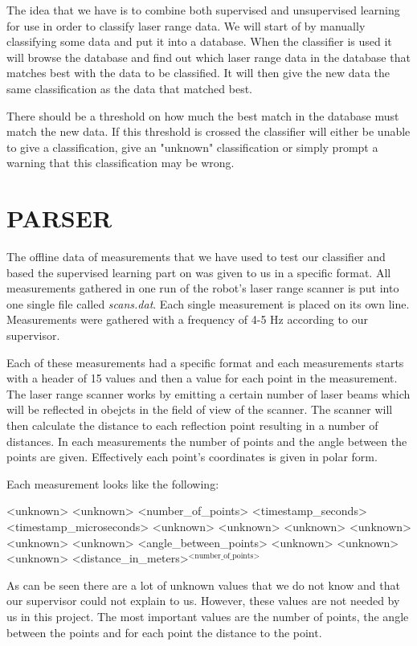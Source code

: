 \documentclass[a4paper, 10pt, conference]{ieeeconf}      %
\begin{document}
The idea that we have is to combine both supervised and unsupervised learning for use in order to classify laser range data. We will start of by manually classifying some data and put it into a database. When the classifier is used it will browse the database and find out which laser range data in the database that matches best with the data to be classified. It will then give the new data the same classification as the data that matched best.

There should be a threshold on how much the best match in the database must match the new data. If this threshold is crossed the classifier will either be unable to give a classification, give an "unknown" classification or simply prompt a warning that this classification may be wrong.

\section{PARSER}
The offline data of measurements that we have used to test our classifier and based the supervised learning part on was given to us in a specific format. All measurements gathered in one run of the robot's laser range scanner is put into one single file called \emph{scans.dat}. Each single measurement is placed on its own line. Measurements were gathered with a frequency of 4-5 Hz according to our supervisor.

Each of these measurements had a specific format and each measurements starts with a header of 15 values and then a value for each point in the measurement. The laser range scanner works by emitting a certain number of laser beams which will be reflected in obejcts in the field of view of the scanner. The scanner will then calculate the distance to each reflection point resulting in a number of distances. In each measurements the number of points and the angle between the points are given. Effectively each point's coordinates is given in polar form.

Each measurement looks like the following:


<unknown> <unknown> <number\_of\_points> <timestamp\_seconds> <timestamp\_microseconds> <unknown> <unknown> <unknown> <unknown> <unknown> <unknown> <angle\_between\_points> <unknown> <unknown> <unknown> <distance\_in\_meters>$^{\text{<number\_of\_points>}}$

As can be seen there are a lot of unknown values that we do not know and that our supervisor could not explain to us. However, these values are not needed by us in this project. The most important values are the number of points, the angle between the points and for each point the distance to the point.
\end{document}
